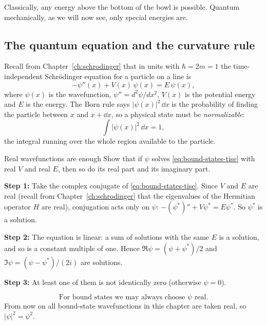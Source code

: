 Classically, any energy above the bottom of the bowl is possible. Quantum mechanically, as we will now see, only special energies are.

\subsection{The quantum equation and the curvature rule}

Recall from Chapter~\ref{ch:schrodinger} that in units with $\hbar=2m=1$ the time-independent Schr\"odinger equation for a particle on a line is
\begin{equation}
-\psi''(x)+V(x)\,\psi(x)=E\,\psi(x),
\label{eq:bound-states-tise}
\end{equation}
where $\psi(x)$ is the wavefunction, $\psi''=d^2\psi/dx^2$, $V(x)$ is the potential energy and $E$ is the energy. The Born rule says $|\psi(x)|^2\,\dd x$ is the probability of finding the particle between $x$ and $x+\dd x$, so a physical state must be \emph{normalizable}:
\begin{equation}
\int |\psi(x)|^2\,\dd x = 1 ,
\label{eq:bound-states-norm}
\end{equation}
the integral running over the whole region available to the particle.

\begin{sample}{Real wavefunctions are enough}
Show that if $\psi$ solves \cref{eq:bound-states-tise} with real $V$ and real $E$, then so do its real part and its imaginary part.

\textbf{Step 1:} Take the complex conjugate of \cref{eq:bound-states-tise}. Since $V$ and $E$ are real (recall from Chapter~\ref{ch:schrodinger} that the eigenvalues of the Hermitian operator $H$ are real), conjugation acts only on $\psi$: $-(\psi^*)''+V\psi^*=E\psi^*$. So $\psi^*$ is a solution.

\textbf{Step 2:} The equation is linear: a sum of solutions with the same $E$ is a solution, and so is a constant multiple of one. Hence $\Re\psi=(\psi+\psi^*)/2$ and $\Im\psi=(\psi-\psi^*)/(2i)$ are solutions.

\textbf{Step 3:} At least one of them is not identically zero (otherwise $\psi=0$).

\[
\boxed{\text{For bound states we may always choose } \psi \text{ real.}}
\]
From now on all bound-state wavefunctions in this chapter are taken real, so $|\psi|^2=\psi^2$.
\end{sample}

